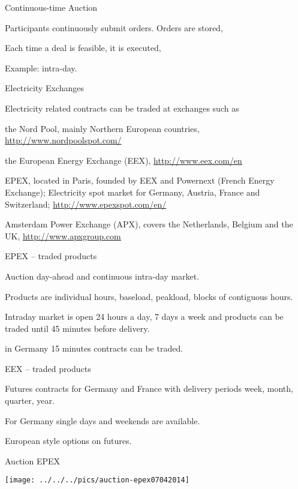 
	Continuous-time Auction


	Participants continuously submit orders. Orders are stored,

	Each time a deal is feasible, it is executed,

	Example: intra-day.



{Electricity Exchanges}

Electricity related contracts  can be traded at exchanges such as


	the Nord Pool, mainly Northern European countries, \url{http://www.nordpoolspot.com/}

	the European Energy Exchange (EEX), \url{http://www.eex.com/en}

	EPEX, located in Paris, founded by EEX and Powernext (French Energy Exchange);
Electricity spot market for Germany, Austria, France and Switzerland;
\url{http://www.epexspot.com/en/}

	Amsterdam Power Exchange (APX), covers the Netherlands, Belgium and the UK, \url{http://www.apxgroup.com}


{EPEX -- traded products}


	Auction day-ahead and continuous intra-day market.

	Products are individual hours, baseload, peakload, blocks of contiguous hours.

	Intraday market is open 24 hours a day, 7 days a week and products can be traded until 45 minutes before delivery.

	in Germany 15 minutes contracts can be traded.


{EEX -- traded products}


	Futures contracts for Germany and France with delivery periods week, month, quarter, year.

	For Germany single days and weekends are available.

	European style options on futures.


{Auction EPEX}
\begin{center}
\texttt{[image: ../../../pics/auction-epex07042014]}
\end{center}

